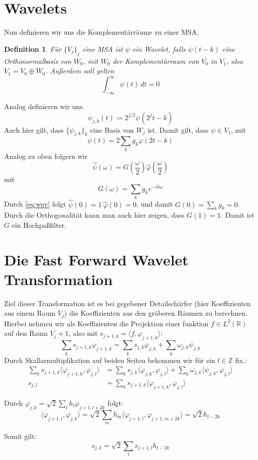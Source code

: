 \documentclass[]{scrartcl}
\theoremstyle{plain}
\newtheorem{defn}[theo]{Definition}
\theoremstyle{remark}
\newcommand{\lR}{L^2(\mathbb{R})}
\begin{document}
    \section{Wavelets}

    Nun definieren wir uns die Komplementärräume zu einer MSA.

    \begin{defn}
        Für $\{V_j\}_j$ eine MSA ist $\psi$ ein Wavelet, falls $\psi(t-k)$ eine Orthonormalbasis von $W_0$, mit $W_0$ der Komplementärraum von $V_0$ in $V_1$, also $V_1 = V_0 \oplus W_0$. Außerdem soll gelten 
        \begin{equation}
            \int_{-\infty}^\infty \psi(t) \, dt = 0 \label{eq:wav}
        \end{equation}
    \end{defn}

    Analog definieren wir uns
    $$\psi_{j, k}(t) \coloneqq 2^{j/2} \psi(2^j t - k)$$
    Auch hier gilt, dass $\{\psi_{j,k}\}_k$ eine Basis von $W_j$ ist.
    Damit gilt, dass $\psi \in V_1$, mit
    $$\psi (t) = 2 \sum_k g_k \varphi (2t - k)$$
    Analog zu oben folgern wir 
    $$\hat{\psi} (\omega) = G(\frac{\omega}{2}) \hat{\varphi}(\frac{\omega}{2})$$
    mit
    $$G(\omega) = \sum_k g_k e^{-ik\omega}$$
    Durch \autoref{eq:wav} folgt $\hat{\psi}(0) = 1 \: \hat{\varphi}(0) = 0$, und damit $G(0) = \sum_k g_k = 0$. Durch die Orthogonalität kann man auch hier zeigen, dass $G(1) = 1$. Damit ist $G$ ein Hochpaßfilter.

    \section{Die Fast Forward Wavelet Transformation}

    Ziel dieser Transformation ist es bei gegebener Detailschärfer (hier Koeffizienten aus einem Raum $V_j$) die Koeffizienten aus den gröberen Räumen zu berechnen.
    Hierbei nehmen wir als Koeffizienten die Projektion einer funktion $f \in \lR$ auf den Raum $V_j+1$, also mit $s_{j+1, k} = \langle f, \varphi_{j + 1, k}\rangle$:
    $$\sum_k s_{j+1, k} \varphi_{j+1, k} = \sum_k s_{j,k} \varphi_{j,k} + \sum_k \omega_{j, k} \psi_{j, k}$$
    Durch Skallarmultiplikation auf beiden Seiten bekommen wir für ein $l \in \mathbb{Z}$ fix.:
    \begin{align*}
        \sum_k s_{j+1, k} \langle \varphi_{j+1, k}, \varphi_{j, l} \rangle &= \sum_k s_{j,k} \langle \varphi_{j,k}, \varphi_{j, l} \rangle + \sum_k \omega_{j, k} \langle \psi_{j, k}, \varphi_{j, l} \rangle \\
        s_{j, l} &= \sum_k s_{j+1, k} \langle \varphi_{j+1, k}, \varphi_{j, l} \rangle 
    \end{align*}

    Durch $\varphi_{j,k} = \sqrt{2} \sum_l h_l \varphi_{j+1, l+2k}$ folgt:
    $$\langle \varphi_{j+1, l}, \varphi_{j, k} \rangle = \sqrt{2} \sum_m h_m \langle \varphi_{j+1, l}, \varphi_{j+1, m + 2k} \rangle = \sqrt{2} h_{l-2k}$$

    Somit gilt:
    $$s_{j, k} = \sqrt{2} \sum_l s_{j+1, l} h_{l - 2k}$$
\end{document}
